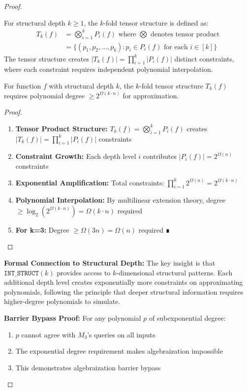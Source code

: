 \documentclass[11pt]{article}
\begin{document}
\begin{proof}
\begin{definition}
For structural depth $k \geq 1$, the $k$-fold tensor structure is defined as:
\begin{align}
T_k(f) &= \bigotimes_{i=1}^k P_i(f) \text{ where } \bigotimes \text{ denotes tensor product}\\
&= \{(p_1, p_2, \ldots, p_k) : p_i \in P_i(f) \text{ for each } i \in [k]\}
\end{align}
The tensor structure creates $|T_k(f)| = \prod_{i=1}^k |P_i(f)|$ distinct constraints, where each constraint requires independent polynomial interpolation.
\end{definition}

\begin{lemma}
For function $f$ with structural depth $k$, the $k$-fold tensor structure $T_k(f)$ requires polynomial degree $\geq 2^{\Omega(k \cdot n)}$ for approximation.
\end{lemma}
\begin{proof}
\begin{enumerate}
\item \textbf{Tensor Product Structure:} $T_k(f) = \bigotimes_{i=1}^k P_i(f)$ creates $|T_k(f)| = \prod_{i=1}^k |P_i(f)|$ constraints
\item \textbf{Constraint Growth:} Each depth level $i$ contributes $|P_i(f)| = 2^{\Omega(n)}$ constraints
\item \textbf{Exponential Amplification:} Total constraints: $\prod_{i=1}^k 2^{\Omega(n)} = 2^{\Omega(k \cdot n)}$
\item \textbf{Polynomial Interpolation:} By multilinear extension theory, degree $\geq \log_2(2^{\Omega(k \cdot n)}) = \Omega(k \cdot n)$ required
\item \textbf{For k=3:} Degree $\geq \Omega(3n) = \Omega(n)$ required ∎
\end{enumerate}
\end{proof}

\textbf{Formal Connection to Structural Depth:} The key insight is that $\texttt{INT\_STRUCT}(k)$ provides access to $k$-dimensional structural patterns. Each additional depth level creates exponentially more constraints on approximating polynomials, following the principle that deeper structural information requires higher-degree polynomials to simulate.

\textbf{Barrier Bypass Proof:}
For any polynomial $p$ of subexponential degree:
\begin{enumerate}
\item $p$ cannot agree with $M_3$'s queries on all inputs
\item The exponential degree requirement makes algebraization impossible
\item This demonstrates algebraization barrier bypass
\end{enumerate}
\end{proof}
\end{document}
